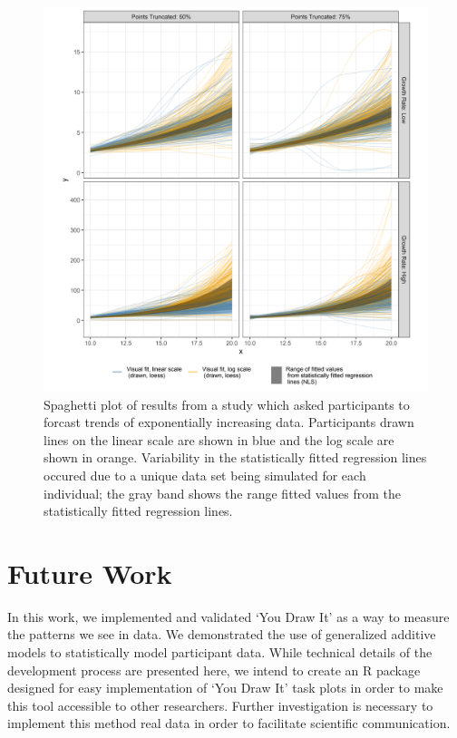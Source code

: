 \documentclass[10pt]{article}
\begin{document}
\begin{figure}[ht]
\begin{center}
\centerline{\includegraphics[width=\columnwidth]{images/exponential-yloess-spaghetti-plot-2-1}}
\caption{Spaghetti plot of results from a study which asked participants to forcast trends of exponentially increasing data. Participants drawn lines on the linear scale are shown in blue and the log scale are shown in orange. Variability in the statistically fitted regression lines occured due to a unique data set being simulated for each individual; the gray band shows the range fitted values from the statistically fitted regression lines.}
\label{exponential-yloess-spaghetti-plot-2-1}
\end{center}
\end{figure}

\section{Future Work}

In this work, we implemented and validated `You Draw It' as a way to
measure the patterns we see in data. We demonstrated the use of
generalized additive models to statistically model participant data.
While technical details of the development process are presented here,
we intend to create an R package designed for easy implementation of
`You Draw It' task plots in order to make this tool accessible to other
researchers. Further investigation is necessary to implement this method
real data in order to facilitate scientific communication.



% 
\end{document}
